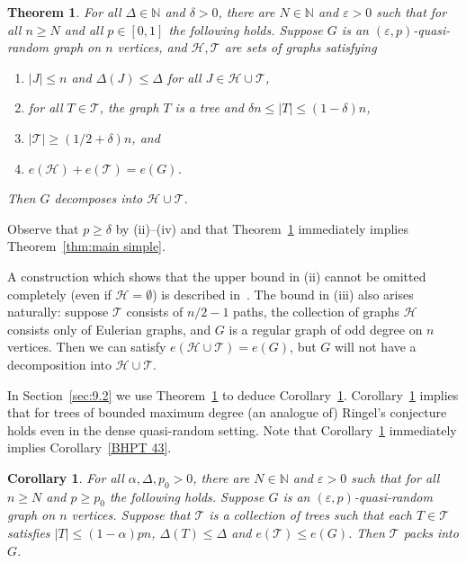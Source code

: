 \documentclass[a4paper, 11pt, reqno]{amsart}
\newtheorem{theorem}[definition]{Theorem}
\newtheorem{corollary}[definition]{Corollary}
\numberwithin{equation}{section}
\newcommand{\1}{{\rm 1\hspace*{-0.4ex}%
\rule{0.1ex}{1.52ex}\hspace*{0.2ex}}}
\newcommand{\N}{\mathbb N}
\newcommand{\cT}{\mathcal{T}}
\newcommand{\cH}{\mathcal{H}}
\renewcommand{\epsilon}{\varepsilon}
\begin{document}
\begin{theorem}\label{thm: main result}
For all $\Delta \in \N$ and $\delta>0$, 
there are $N\in \N$ and $\epsilon>0$ such that
for all $n\geq N$ and all $p \in [0,1]$ the following holds.
Suppose $G$ is an $(\epsilon,p)$-quasi-random graph on $n$ vertices, and  $\cH,\cT$ are sets of graphs satisfying 
\begin{enumerate}[label=(\roman*)]
	\item\label{item:MT1} $|J|\leq n$ and $\Delta(J)\leq \Delta$ for all $J\in \cH\cup \cT$,
	\item\label{item:MT2} for all $T\in \cT$, the graph $T$ is a tree and $\delta n \leq |T|\leq (1- \delta)n$,
	\item\label{item:MT3} $|\cT|\geq (1/2+ \delta)n$, and
	\item\label{item:MT4} $e(\cH)+e(\cT)=e(G)$.
\end{enumerate}
Then $G$ decomposes into $\cH \cup \cT$.
\end{theorem}
Observe that $p\geq \delta$ by (ii)--(iv) and that Theorem~\ref{thm: main result} immediately implies Theorem~\ref{thm:main simple}.

A construction which shows that the upper bound in (ii) cannot be omitted completely (even if $\cH=\emptyset$) is described in~\cite{BHPT16}.
The bound in (iii) also arises naturally:
suppose $\cT$ consists of $n/2-1$ paths,
the collection of graphs $\cH$ consists only of Eulerian graphs, and $G$ is a regular graph of odd degree on $n$ vertices.
Then we can satisfy $e(\cH\cup \cT)=e(G)$,
but $G$ will not have a decomposition into $\cH \cup \cT$.

In Section~\ref{sec:9.2} we use Theorem~\ref{thm: main result} to deduce Corollary~\ref{cor: trees into quasi-random}.
Corollary~\ref{cor: trees into quasi-random} implies that for trees of bounded maximum degree (an analogue of) Ringel's conjecture holds even in the dense quasi-random setting.
Note that Corollary~\ref{cor: trees into quasi-random} immediately implies Corollary~\ref{BHPT 43}.

\begin{corollary}\label{cor: trees into quasi-random}
For all $\alpha,\Delta,p_0  >0$, there are $N\in \N$ and $\epsilon>0$ such that for all $n\geq N$ and $p\geq p_0$ the following holds. 
Suppose $G$ is an $(\epsilon,p)$-quasi-random graph on $n$ vertices. 
Suppose that $\cT$ is a collection of trees such that each $T\in \cT$ satisfies
$|T|\leq (1-\alpha)pn$, $\Delta(T)\leq \Delta$ and $e(\cT) \leq e(G)$. 
Then $\cT$ packs into $G$.
\end{corollary}
\end{document}
